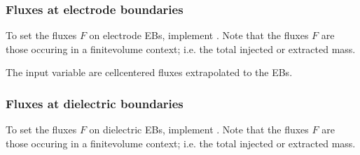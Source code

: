 \documentclass[letterpaper,10pt,english]{sphinxmanual}
\begin{document}
\subsubsection{Fluxes at electrode boundaries}
\label{\detokenize{Applications/CdrPlasmaModel:fluxes-at-electrode-boundaries}}
\sphinxAtStartPar
To set the fluxes \(F\) on electrode EBs, implement .
Note that the fluxes \(F\) are those occuring in a finite\sphinxhyphen{}volume context; i.e. the total injected or extracted mass.

\begin{sphinxVerbatim}[commandchars=\\\{\},formatcom=\scriptsize]
           
                                             
                                             
                                             
                                         
                                         
                                         
                                         
                                           
     
\end{sphinxVerbatim}

\sphinxAtStartPar
The input variable  are cell\sphinxhyphen{}centered fluxes extrapolated to the EBs.


\subsubsection{Fluxes at dielectric boundaries}
\label{\detokenize{Applications/CdrPlasmaModel:fluxes-at-dielectric-boundaries}}
\sphinxAtStartPar
To set the fluxes \(F\) on dielectric EBs, implement .
Note that the fluxes \(F\) are those occuring in a finite\sphinxhyphen{}volume context; i.e. the total injected or extracted mass.
\end{document}
